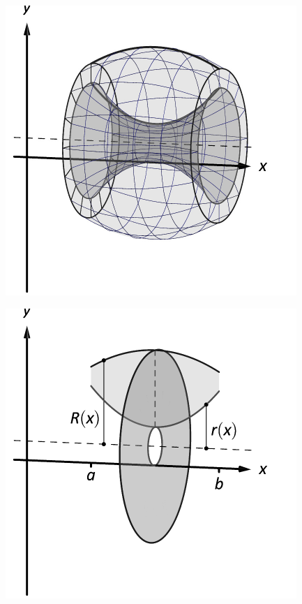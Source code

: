 \documentclass[10pt]{article}
\begin{document}
\includegraphics{figwasher_idea_b_3DBW.pdf}
\texttt{}

\includegraphics{figwasher_idea_c_3DBW.pdf}
\texttt{}
\end{document}

